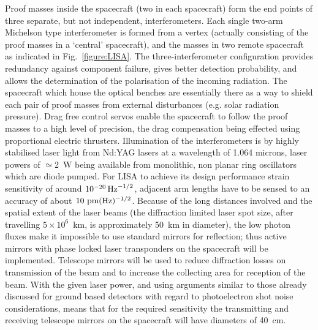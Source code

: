 \documentclass{article}
\begin{document}
Proof masses inside the spacecraft (two in each spacecraft) form the end points
of three separate, but not independent, interferometers. Each single two-arm 
Michelson type interferometer is formed from a vertex (actually consisting of
the proof masses in a `central' spacecraft), and the masses in two remote
spacecraft as indicated in Fig.~\ref{figure:LISA}. The 
three-interferometer configuration provides redundancy against component
failure, gives better detection probability, and allows the determination of the
polarisation of the incoming radiation. The spacecraft which house the optical benches
are essentially there as a way to shield each pair of proof masses from external disturbances (e.g.
solar radiation pressure). Drag free control servos enable the spacecraft to
follow the proof masses to a high level of precision, the drag compensation
being effected using proportional electric thrusters. Illumination of the
interferometers is by highly stabilised laser light from Nd:YAG lasers at a
wavelength of 1.064 microns, laser powers of $\simeq$2~W being available from
monolithic, non planar ring oscillators which are diode pumped.  For LISA
to achieve its design performance strain sensitivity of around $10^{-20}\,{\rm
Hz}^{-1/2}$, adjacent arm lengths have to be sensed to an accuracy of about $10
{\rm \ pm}(\rm Hz)^{-1/2}$. Because of the long distances involved and the
spatial extent of the laser beams (the diffraction limited laser spot size,
after travelling $5\times10^{6}$~km, is approximately 50~km in diameter), the
low photon fluxes make it impossible to use standard mirrors for reflection;
thus active mirrors with phase locked laser transponders on the spacecraft will
be implemented. Telescope mirrors will be used to reduce diffraction losses on
transmission of the beam and to increase the collecting area for reception of
the beam. With the given laser power, and using arguments similar to those already 
discussed for ground based detectors with regard to photoelectron shot noise 
considerations, means that for the required sensitivity the transmitting and 
receiving telescope mirrors on the spacecraft will have diameters of 40~cm.

\end{document}

